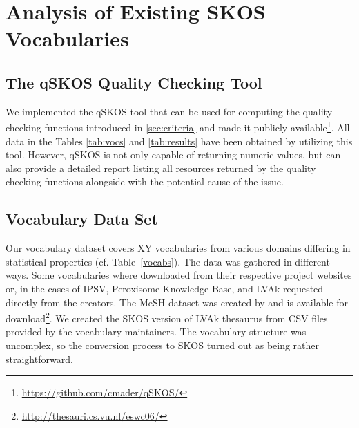 
\section{Analysis of Existing SKOS Vocabularies}\label{sec:analysis}

\subsection{The qSKOS Quality Checking Tool}

We implemented the qSKOS tool that can be used for computing the quality checking functions introduced in \ref{sec:criteria} and made it publicly available\footnote{\url{https://github.com/cmader/qSKOS/}}. All data in the Tables \ref{tab:vocs} and \ref{tab:results} have been obtained by utilizing this tool. However, qSKOS is not only capable of returning numeric values, but can also provide a detailed report listing all resources returned by the quality checking functions alongside with the potential cause of the issue.

\subsection{Vocabulary Data Set}

Our vocabulary dataset covers XY vocabularies from various domains differing in statistical properties (cf. Table~\ref{vocabs}). The data was gathered in different ways. Some vocabularies where downloaded from their respective project websites or, in the cases of IPSV, Peroxisome Knowledge Base, and LVAk requested directly from the creators. The MeSH dataset was created by \cite{Assem2006} and is available for download\footnote{\url{http://thesauri.cs.vu.nl/eswc06/}}. We created the SKOS version of LVAk thesaurus from CSV files provided by the vocabulary maintainers. The vocabulary structure was uncomplex, so the conversion process to SKOS turned out as being rather straightforward.

